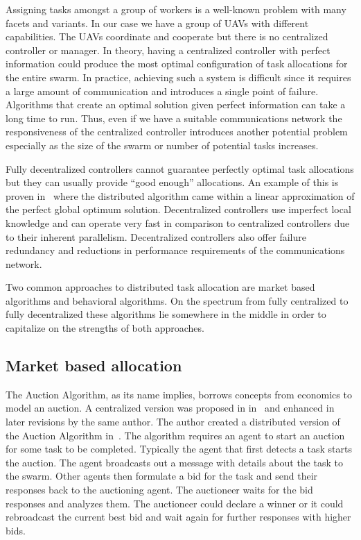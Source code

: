 Assigning tasks amongst a group of workers is a well-known problem with many facets and variants.  In our case we have a group of UAVs with different capabilities.  The UAVs coordinate and cooperate but there is no centralized controller or manager.   In theory, having a centralized controller with perfect information could produce the most optimal configuration of task allocations for the entire swarm.  In practice, achieving such a system is difficult since it requires a large amount of communication and introduces a single point of failure.  Algorithms that create an optimal solution given perfect information can take a long time to run.  Thus, even if we have a suitable communications network the responsiveness of the centralized controller introduces another potential problem especially as the size of the swarm or number of potential tasks increases.

Fully decentralized controllers cannot guarantee perfectly optimal task allocations but they can usually provide ``good enough'' allocations.  An example of this is proven in~\citet{auction_linear_approx} where the distributed algorithm came within a linear approximation of the perfect global optimum solution.  Decentralized controllers use imperfect local knowledge and can operate very fast in comparison to centralized controllers due to their inherent parallelism.  Decentralized controllers also offer failure redundancy and reductions in performance requirements of the communications network.

Two common approaches to distributed task allocation are market based algorithms and behavioral algorithms.  On the spectrum from fully centralized to fully decentralized these algorithms lie somewhere in the middle in order to capitalize on the strengths of both approaches.

\subsection{Market based allocation}

The Auction Algorithm, as its name implies, borrows concepts from economics to model an auction.  A centralized version was proposed in in~\citet{auction_derive} and enhanced in later revisions by the same author.  The author created a distributed version of the Auction Algorithm in~\citet{auction_parallel}.  The algorithm requires an agent to start an auction for some task to be completed.  Typically the agent that first detects a task starts the auction.  The agent broadcasts out a message with details about the task to the swarm.  Other agents then formulate a bid for the task and send their responses back to the auctioning agent.  The auctioneer waits for the bid responses and analyzes them.  The auctioneer could declare a winner or it could rebroadcast the current best bid and wait again for further responses with higher bids.  

